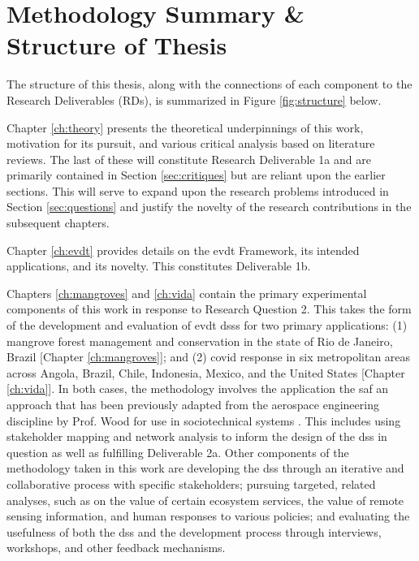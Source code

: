 \section{Methodology Summary \& Structure of Thesis}

The structure of this thesis, along with the connections of each component to the Research Deliverables (RDs), is summarized in Figure \ref{fig:structure} below.

Chapter \ref{ch:theory} presents the theoretical underpinnings of this work, motivation for its pursuit, and various critical analysis based on literature reviews. The last of these will constitute Research Deliverable 1a and are primarily contained in Section \ref{sec:critiques} but are reliant upon the earlier sections. This will serve to expand upon the research problems introduced in Section \ref{sec:questions} and justify the novelty of the research contributions in the subsequent chapters. 

Chapter \ref{ch:evdt} provides details on the \ac{evdt} Framework, its intended applications, and its novelty. This constitutes Deliverable 1b. 

Chapters \ref{ch:mangroves} and \ref{ch:vida} contain the primary experimental components of this work in response to Research Question 2. This takes the form of the development and evaluation of \ac{evdt} \acp{dss} for two primary applications: (1) mangrove forest management and conservation in the state of Rio de Janeiro, Brazil [Chapter \ref{ch:mangroves}]; and (2) \ac{covid} response in six metropolitan areas across Angola, Brazil, Chile, Indonesia, Mexico, and the United States [Chapter \ref{ch:vida}]. In both cases, the methodology involves the application the \ac{saf} \cite{maierArtSystemsArchitecting2009, crawleySystemArchitectureStrategy2015} an approach that has been previously adapted from the aerospace engineering discipline by Prof. Wood for use in sociotechnical systems \cite{pfotenhauerArchitectingComplexInternational2016}. This includes using stakeholder mapping and network analysis to inform the design of the \ac{dss} in question as well as fulfilling Deliverable 2a. Other components of the methodology taken in this work are developing the \ac{dss} through an iterative and collaborative process with specific stakeholders; pursuing targeted, related analyses, such as on the value of certain ecosystem services, the value of remote sensing information, and human responses to various policies; and evaluating the usefulness of both the \ac{dss} and the development process through interviews, workshops, and other feedback mechanisms. 

